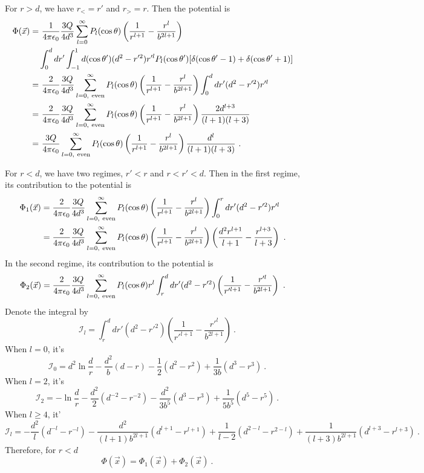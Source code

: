 \documentclass[12pt]{article}
\begin{document}
For $r > d$, we have $r_< = r'$ and $r_> = r$.
Then the potential is
\begin{align}
    \Phi(\vec x) =&~ \frac{1}{4\pi \epsilon_0}\frac{3 Q}{4d^3}\sum_{l =0}^\infty P_l(\cos\theta) \left(\frac{1}{r^{l+1}} - \frac{r^l}{b^{2l+1}}\right) \cr
    & \int_0^{d}dr' \int_{-1}^1 d(\cos \theta') (d^2 - r'^2)r'^l P_l(\cos \theta')
    [\delta(\cos \theta' -1) + \delta (\cos \theta' + 1)] \cr
    =&~ \frac{2}{4\pi \epsilon_0}\frac{3Q}{4d^3}\sum_{l = 0,~{\rm even}}^\infty P_l(\cos \theta) \left(\frac{1}{r^{l+1}} - \frac{r^l}{b^{2l+1}}\right)  \int_0^d dr'(d^2 - r'^2) r'^l \cr
    =&~ \frac{2}{4\pi \epsilon_0}\frac{3Q}{4d^3}\sum_{l = 0,~{\rm even}}^\infty P_l(\cos \theta) \left(\frac{1}{r^{l+1}} - \frac{r^l}{b^{2l+1}}\right)  \frac{2 d^{l+3}}{(l+1)(l+3)}\cr
    =&~ \frac{3Q}{4\pi \epsilon_0}\sum_{l = 0,~{\rm even}}^\infty P_l(\cos \theta) \left(\frac{1}{r^{l+1}} - \frac{r^l}{b^{2l+1}}\right)  \frac{d^{l}}{(l+1)(l+3)}~.
\end{align}

For $r < d$, we have two regimes, $r' < r$ and $r < r' < d$. Then in the first regime, its contribution to the potential is
\begin{align}
    \Phi_1(\vec x) &= \frac{2}{4\pi \epsilon_0} \frac{3Q}{4d^3} \sum_{l = 0,~{\rm even}}^\infty P_l(\cos \theta) \left(\frac{1}{r^{l+1}} - \frac{r^l}{b^{2l+1}}\right) \int_0^r dr' (d^2 - r'^2) r'^l\cr
    &=\frac{2}{4\pi \epsilon_0} \frac{3Q}{4d^3} \sum_{l = 0,~{\rm even}}^\infty P_l(\cos \theta) \left(\frac{1}{r^{l+1}} - \frac{r^l}{b^{2l+1}}\right) \left(\frac{d^2 r^{l+1} }{l+1} - \frac{r^{l+3}}{l+3} \right)~.
\end{align}
In the second regime, its contribution to the potential is
\begin{align}
    \Phi_2(\vec x) &= \frac{2}{4\pi \epsilon_0} \frac{3Q}{4d^3} \sum_{l = 0,~{\rm even}}^\infty P_l(\cos \theta) r^l \int_r^d dr' (d^2 - r'^2) \left(\frac{1}{r'^{l+1}} - \frac{r'^l}{b^{2l+1}}\right)~.
\end{align}
Denote the integral by
\begin{equation}
    \mathcal I_l = \int_r^d dr' (d^2 - r'^2) \left(\frac{1}{r'^{l+1}} - \frac{r'^l}{b^{2l+1}}\right)~.
\end{equation}
When $l = 0$, it's
\begin{equation}
    \mathcal I_0 = d^2 \ln \frac dr - \frac{d^2}{b}(d-r) - \frac 12(d^2 - r^2) + \frac{1}{3b}(d^3 - r^3)~.
\end{equation}
When $l = 2$, it's
\begin{equation}
    \mathcal I_2 = -\ln\frac{d}{r} - \frac{d^2}{2}(d^{-2} - r^{-2}) - \frac{d^2}{3b^5}(d^3 - r^3) + \frac{1}{5 b^5}(d^5 - r^5)~.
\end{equation}
When $l \ge 4$, it'
\begin{equation}
    \mathcal I_l = -\frac{d^2}{l}(d^{-l} - r^{-l}) - \frac{d^2}{(l+1) b^{2l+1}} (d^{l+1} - r^{l+1}) + \frac{1}{l-2} (d^{2-l} - r^{2-l}) + \frac{1}{(l+3) b^{2l+1}} (d^{l+3} - r^{l+3})~.
\end{equation}
Therefore, for $r< d$
\begin{equation}
    \Phi(\vec x) = \Phi_1(\vec x) + \Phi_2(\vec x)~.
\end{equation}
\end{document}
